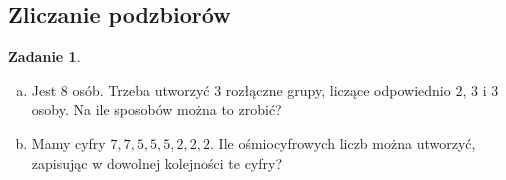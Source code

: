 \documentclass[11pt]{article}
\theoremstyle{definition}
\newtheorem{zadanie}{Zadanie}
\numberwithin{zadanie}{subsection}
\begin{document}
\subsection{Zliczanie podzbiorów}


\begin{zadanie}
    \begin{enumerate}[a)]
        \item Jest 8 osób. Trzeba utworzyć 3 rozłączne grupy, liczące odpowiednio $2$, $3$ i $3$ osoby. Na ile sposobów można to zrobić?
        \item Mamy cyfry $7,7,5,5,5,2,2,2$. Ile ośmiocyfrowych liczb można utworzyć, zapisując w dowolnej kolejności te cyfry?
    \end{enumerate}
\end{zadanie}
\end{document}
